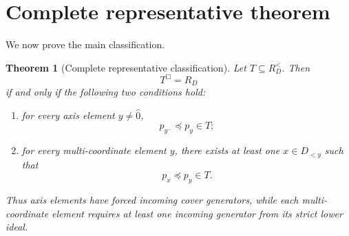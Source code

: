 \documentclass[11pt]{article}
\newtheorem{theorem}{Theorem}[section]
\begin{document}
\section{Complete representative theorem}

We now prove the main classification.

\begin{theorem}[Complete representative classification]
Let $T\subseteq R_D^{<}$. Then
\[
T^\Box=R_D
\]
if and only if the following two conditions hold:
\begin{enumerate}
\item for every axis element $y\ne\hat{0}$,
\[
p_{y^-}\preceq p_y\in T;
\]
\item for every multi-coordinate element $y$, there exists at least one $x\in D_{<y}$ such that
\[
p_x\preceq p_y\in T.
\]
\end{enumerate}
Thus axis elements have forced incoming cover generators, while each multi-coordinate element requires at least one incoming generator from its strict lower ideal.
\end{theorem}
\end{document}
